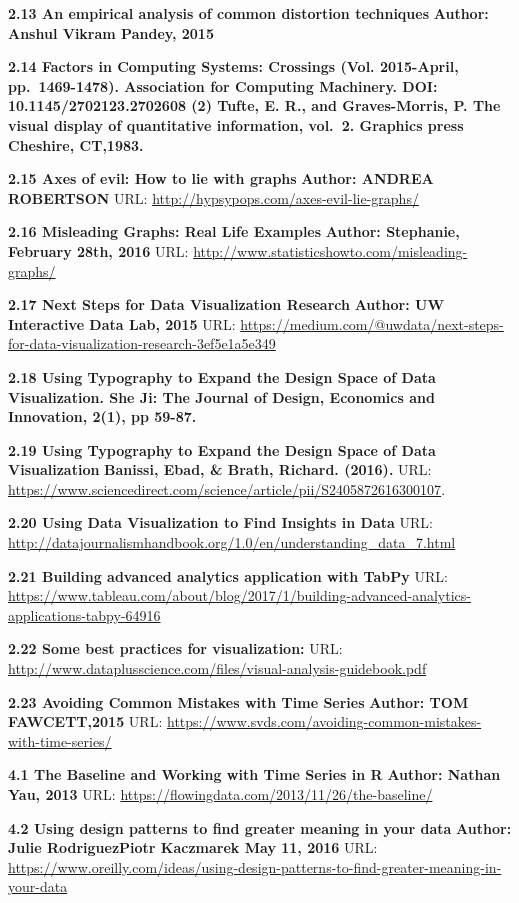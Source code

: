 \documentclass[]{book}
\theoremstyle{definition}
\theoremstyle{definition}
\theoremstyle{definition}
\theoremstyle{remark}
\begin{document}
\textbf{2.13 An empirical analysis of common distortion techniques}
\textbf{Author: Anshul Vikram Pandey, 2015 }

\textbf{2.14 Factors in Computing Systems: Crossings (Vol. 2015-April,
pp.~1469-1478). Association for Computing Machinery. DOI:
10.1145/2702123.2702608 (2) Tufte, E. R., and Graves-Morris, P. The
visual display of quantitative information, vol.~2. Graphics press
Cheshire, CT,1983.}

\textbf{2.15 Axes of evil: How to lie with graphs} \textbf{Author:
ANDREA ROBERTSON} URL: \url{http://hypsypops.com/axes-evil-lie-graphs/}

\textbf{2.16 Misleading Graphs: Real Life Examples} \textbf{Author:
Stephanie, February 28th, 2016} URL:
\url{http://www.statisticshowto.com/misleading-graphs/}

\textbf{2.17 Next Steps for Data Visualization Research} \textbf{Author:
UW Interactive Data Lab, 2015} URL:
\url{https://medium.com/@uwdata/next-steps-for-data-visualization-research-3ef5e1a5e349}

\textbf{2.18 Using Typography to Expand the Design Space of Data
Visualization. She Ji: The Journal of Design, Economics and Innovation,
2(1), pp 59-87.}

\textbf{2.19 Using Typography to Expand the Design Space of Data
Visualization} \textbf{Banissi, Ebad, \& Brath, Richard. (2016). } URL:
\url{https://www.sciencedirect.com/science/article/pii/S2405872616300107}.

\textbf{2.20 Using Data Visualization to Find Insights in Data} URL:
\url{http://datajournalismhandbook.org/1.0/en/understanding_data_7.html}

\textbf{2.21 Building advanced analytics application with TabPy} URL:
\url{https://www.tableau.com/about/blog/2017/1/building-advanced-analytics-applications-tabpy-64916}

\textbf{2.22 Some best practices for visualization:} URL:
\url{http://www.dataplusscience.com/files/visual-analysis-guidebook.pdf}

\textbf{2.23 Avoiding Common Mistakes with Time Series} \textbf{Author:
TOM FAWCETT,2015} URL:
\url{https://www.svds.com/avoiding-common-mistakes-with-time-series/}

\textbf{4.1 The Baseline and Working with Time Series in R}
\textbf{Author: Nathan Yau, 2013} URL:
\url{https://flowingdata.com/2013/11/26/the-baseline/}

\textbf{4.2 Using design patterns to find greater meaning in your data}
\textbf{Author: Julie RodriguezPiotr Kaczmarek May 11, 2016} URL:
\url{https://www.oreilly.com/ideas/using-design-patterns-to-find-greater-meaning-in-your-data}
\end{document}

